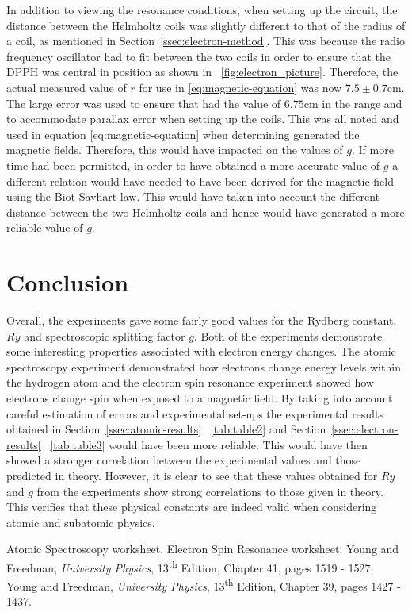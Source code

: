 \documentclass{article}
\newcommand{\figref}[2][\figurename~]{#1\ref{#2}}
\newcommand{\tabref}[2][\tablename~]{#1\ref{#2}}
\newcommand{\secref}[2][Section~]{#1\ref{#2}}
\begin{document}
\vspace{2mm}
\noindent
In addition to viewing the resonance conditions, when setting up the circuit, the distance between the Helmholtz coils was slightly different to that of the radius of a coil, as mentioned in \secref{ssec:electron-method}. This was because the radio frequency oscillator had to fit between the two coils in order to ensure that the DPPH was central in position as shown in \figref{fig:electron_picture}. Therefore, the actual measured value of $r$ for use in \eqref{eq:magnetic-equation} was now $7.5 \pm0.7$cm. The large error was used to ensure that had the value of $6.75$cm in the range and to accommodate parallax error when setting up the coils. This was all noted and used in equation \eqref{eq:magnetic-equation} when determining generated the magnetic fields. Therefore, this would have impacted on the values of $g$. If more time had been permitted, in order to have obtained a more accurate value of $g$ a different relation would have needed to have been derived for the magnetic field using the Biot-Savhart law. This would have taken into account the different distance between the two Helmholtz coils and hence would have generated a more reliable value of $g$.


\section{Conclusion}
\label{sec:conclusion}
Overall, the experiments gave some fairly good values for the Rydberg constant, $Ry$ and spectroscopic splitting factor $g$. Both of the experiments demonstrate some interesting properties associated with electron energy changes. The atomic spectroscopy experiment demonstrated how electrons change energy levels within the hydrogen atom and the electron spin resonance experiment showed how electrons change spin when exposed to a magnetic field. By taking into account careful estimation of errors and experimental set-ups the experimental results obtained in \secref{ssec:atomic-results} \tabref{tab:table2} and \secref{ssec:electron-results} \tabref{tab:table3} would have been more reliable. This would have then showed a stronger correlation between the experimental values and those predicted in theory. However, it is clear to see that these values obtained  for $Ry$ and $g$ from the experiments show strong correlations to those given in theory. This verifies that these physical constants are indeed valid when considering atomic and subatomic physics. 


\begin{thebibliography}{9}
 Atomic Spectroscopy worksheet.
 Electron Spin Resonance worksheet. 
 Young and Freedman, \textit{University Physics}, 13\textsuperscript{th} Edition, Chapter 41, pages 1519 - 1527.
 Young and Freedman, \textit{University Physics}, 13\textsuperscript{th} Edition, Chapter 39, pages 1427 - 1437.
\end{thebibliography}
\end{document}
